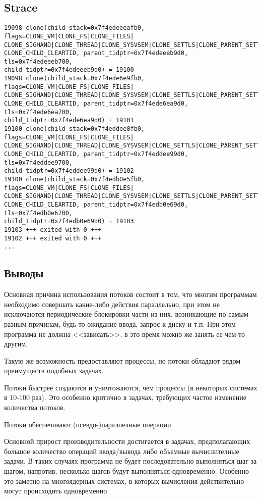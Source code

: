 \documentclass[12pt]{article}
\begin{document}
\subsection*{Strace}
\begin{verbatim}
19098 clone(child_stack=0x7f4edeeeafb0, flags=CLONE_VM|CLONE_FS|CLONE_FILES|
CLONE_SIGHAND|CLONE_THREAD|CLONE_SYSVSEM|CLONE_SETTLS|CLONE_PARENT_SETTID|
CLONE_CHILD_CLEARTID, parent_tidptr=0x7f4edeeeb9d0, tls=0x7f4edeeeb700, 
child_tidptr=0x7f4edeeeb9d0) = 19100
19098 clone(child_stack=0x7f4ede6e9fb0, flags=CLONE_VM|CLONE_FS|CLONE_FILES|
CLONE_SIGHAND|CLONE_THREAD|CLONE_SYSVSEM|CLONE_SETTLS|CLONE_PARENT_SETTID|
CLONE_CHILD_CLEARTID, parent_tidptr=0x7f4ede6ea9d0, tls=0x7f4ede6ea700, 
child_tidptr=0x7f4ede6ea9d0) = 19101
19100 clone(child_stack=0x7f4eddee8fb0, flags=CLONE_VM|CLONE_FS|CLONE_FILES|
CLONE_SIGHAND|CLONE_THREAD|CLONE_SYSVSEM|CLONE_SETTLS|CLONE_PARENT_SETTID|
CLONE_CHILD_CLEARTID, parent_tidptr=0x7f4eddee99d0, tls=0x7f4eddee9700, 
child_tidptr=0x7f4eddee99d0) = 19102
19100 clone(child_stack=0x7f4edb0e5fb0, flags=CLONE_VM|CLONE_FS|CLONE_FILES|
CLONE_SIGHAND|CLONE_THREAD|CLONE_SYSVSEM|CLONE_SETTLS|CLONE_PARENT_SETTID|
CLONE_CHILD_CLEARTID, parent_tidptr=0x7f4edb0e69d0, tls=0x7f4edb0e6700, 
child_tidptr=0x7f4edb0e69d0) = 19103
19103 +++ exited with 0 +++
19102 +++ exited with 0 +++
...
\end{verbatim}

\subsection*{Выводы}

Основная причина использования потоков состоит в том, что многим программам необходимо совершать какие-либо действия параллельно, при этом не исключаются периодические блокировки части из них, возникающие по самым разным причинам, будь то ожидание ввода, запрос к диску и т.п. При этом программа не должна <<зависать>>, в это время можно же занять ее чем-то другим.

Такую же возможность предоставляют процессы, но потоки обладают рядом преимуществ подобных задачах.

Потоки быстрее создаются и уничтожаются, чем процессы (в некоторых системах в 10-100 раз).
Это особенно критично в задачах, требующих частое изменение количества потоков.

Потоки обеспечивают (псевдо-)параллелные операции.

Основной прирост производительности достигается в задачах, предполагающих большое количество операций ввода/вывода либо объемные вычислителные задачи. В таких случаях программа не будет последовательно выполняться шаг за шагом, напротив, несколько шагов будут выполняться одновременно. Особенно это заметно на многоядерных системах, в которых вычисления действительно могут происходить одновременно. 
\end{document}
